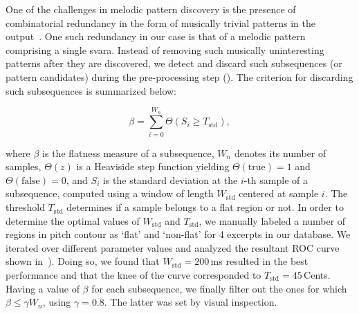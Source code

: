 One of the challenges in melodic pattern discovery is the presence of combinatorial redundancy in the form of musically trivial patterns in the output~\citep{Lartillot2005}. One such redundancy in our case is that of a melodic pattern comprising a single \gls{svara}. Instead of removing such musically uninteresting patterns after they are discovered, we detect and discard such subsequences (or pattern candidates) during the pre-processing step (). The criterion for discarding such subsequences is summarized below:

\begin{equation}
\label{eq:flatness_measure}
\beta =\sum_{i=0}^{W_n} \Theta\left(S_i\geq T_{\text{std}}\right),
\end{equation}


\noindent where $\beta$ is the flatness measure of a subsequence, $W_n$ denotes its number of samples, $\Theta(z)$ is a Heaviside step function yielding $\Theta(\text{true})\!=\!1$ and $\Theta(\text{false})\!=\!0$, and $S_i$ is the standard deviation at the $i$-th sample of a subsequence, computed using a window of length $W_{\text{std}}$ centered at sample $i$. The threshold $T_{\text{std}}$ determines if a sample belongs to a flat region or not. In order to determine the optimal values of $W_{\text{std}}$ and $T_{\text{std}}$, we manually labeled a number of regions in pitch contour as `flat' and `non-flat' for 4 excerpts in our database. We iterated over different parameter values and analyzed the resultant ROC curve shown in~). %
Doing so, we found that $W_{\text{std}}=200$\,ms resulted in the best performance and that the knee of the curve corresponded to $T_{\text{std}}=45$\,Cents. Having a value of $\beta$ for each subsequence, we finally filter out the ones for which $\beta \leq \gamma W_n$, using $\gamma = 0.8$. The latter was set by visual inspection.

